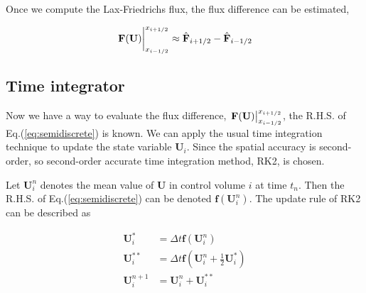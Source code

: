 \documentclass{article}
\begin{document}
    Once we compute the Lax-Friedrichs flux, the flux difference can be estimated,

    \begin{equation}
        \eval{\mathbf{F(U)}}_{x_{i-1/2}}^{x_{i+1/2}} \approx \hat{\mathbf{F}}_{i+1/2} - \hat{\mathbf{F}}_{i-1/2}
    \end{equation}


    \subsection{Time integrator}
    Now we have a way to evaluate the flux difference, $\eval{\mathbf{F(U)}}_{x_{i-1/2}}^{x_{i+1/2}}$, the R.H.S. of Eq.(\ref{eq:semidiscrete}) is known. We can apply the usual time integration technique to update the state variable $\mathbf{U}_i$. Since the spatial accuracy is second-order, so second-order accurate time integration method, RK2, is chosen.

    Let $\mathbf{U}_i^n$ denotes the mean value of $\mathbf{U}$ in control volume $i$ at time $t_n$. Then the R.H.S. of Eq.(\ref{eq:semidiscrete}) can be denoted $\mathbf{f}(\mathbf{U}_i^n)$. The update rule of RK2 can be described as 

    \begin{equation}
        \begin{aligned}
            \mathbf{U}_i^* &= \Delta t\mathbf{f}(\mathbf{U}_i^n) \\
            \mathbf{U}_i^{**} &= \Delta t\mathbf{f}\left(\mathbf{U}_i^n + \frac{1}{2}\mathbf{U}_i^*\right) \\
            \mathbf{U}_i^{n+1} &= \mathbf{U}_i^n + \mathbf{U}_i^{**}
        \end{aligned}
    \end{equation}
\end{document}
